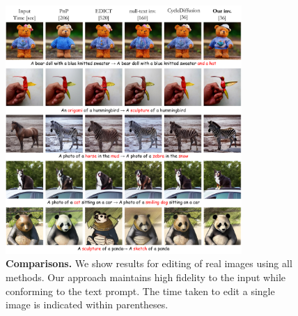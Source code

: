 \begin{figure}
\centering
\includegraphics[width=0.8\textwidth]{ICCV23_submission/figures/comparisons_new.pdf}
\caption{\textbf{Comparisons.} We show results for editing of real images using all methods. Our approach maintains high fidelity to the input while conforming to the text prompt. The time taken to edit a single image is indicated within parentheses.}
\label{fig:comparisons}
\end{figure}
